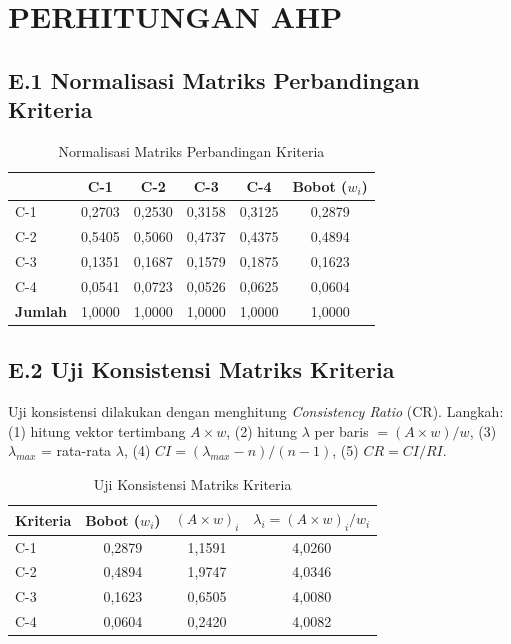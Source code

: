 \chapter{PERHITUNGAN AHP}
\label{chap:lampiran-e}

\section*{E.1 Normalisasi Matriks Perbandingan Kriteria}

\begin{table}[H]
  \caption{Normalisasi Matriks Perbandingan Kriteria}
  \label{tab:norm-kriteria}
  \centering
  \begin{tabular}{| l | c | c | c | c | c |}
    \hline
    & \textbf{C-1} & \textbf{C-2} & \textbf{C-3} & \textbf{C-4} & \textbf{Bobot ($w_i$)} \\
    \hline
    C-1 & 0,2703 & 0,2530 & 0,3158 & 0,3125 & 0,2879 \\
    \hline
    C-2 & 0,5405 & 0,5060 & 0,4737 & 0,4375 & 0,4894 \\
    \hline
    C-3 & 0,1351 & 0,1687 & 0,1579 & 0,1875 & 0,1623 \\
    \hline
    C-4 & 0,0541 & 0,0723 & 0,0526 & 0,0625 & 0,0604 \\
    \hline
    \textbf{Jumlah} & 1,0000 & 1,0000 & 1,0000 & 1,0000 & 1,0000 \\
    \hline
  \end{tabular}
\end{table}

\section*{E.2 Uji Konsistensi Matriks Kriteria}

Uji konsistensi dilakukan dengan menghitung \textit{Consistency Ratio} (CR). Langkah: (1) hitung vektor tertimbang $A \times w$, (2) hitung $\lambda$ per baris $= (A \times w)/w$, (3) $\lambda_{max}$ = rata-rata $\lambda$, (4) $CI = (\lambda_{max} - n)/(n-1)$, (5) $CR = CI/RI$.

\begin{table}[H]
  \caption{Uji Konsistensi Matriks Kriteria}
  \label{tab:uji-konsistensi-kriteria}
  \centering
  \begin{tabular}{| l | c | c | c |}
    \hline
    \textbf{Kriteria} & \textbf{Bobot ($w_i$)} & \textbf{$(A \times w)_i$} & \textbf{$\lambda_i = (A \times w)_i / w_i$} \\
    \hline
    C-1 & 0,2879 & 1,1591 & 4,0260 \\
    \hline
    C-2 & 0,4894 & 1,9747 & 4,0346 \\
    \hline
    C-3 & 0,1623 & 0,6505 & 4,0080 \\
    \hline
    C-4 & 0,0604 & 0,2420 & 4,0082 \\
    \hline
  \end{tabular}
\end{table}

